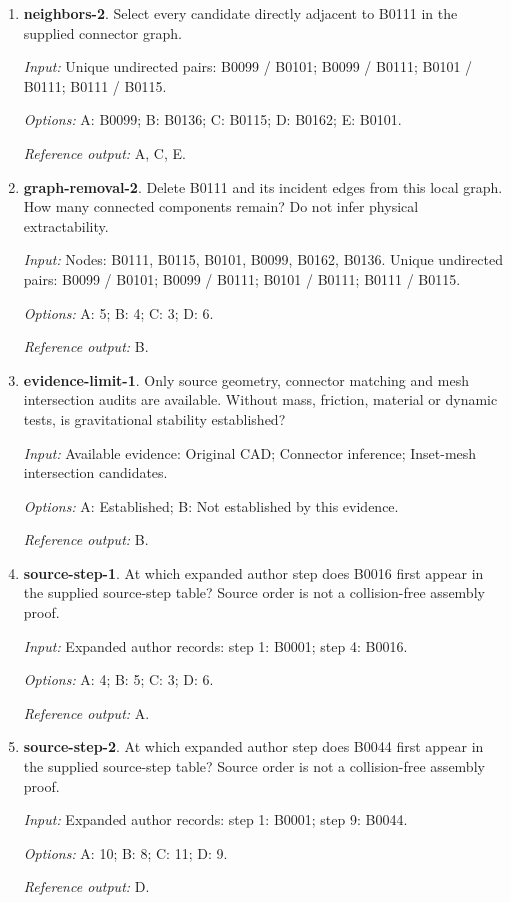 \begin{enumerate}
\item \textbf{neighbors-2}. Select every candidate directly adjacent to B0111 in the supplied connector graph.\par {\small \textit{Input:} Unique undirected pairs: B0099 / B0101; B0099 / B0111; B0101 / B0111; B0111 / B0115. \par\textit{Options:} A: B0099; B: B0136; C: B0115; D: B0162; E: B0101. \par\textit{Reference output:} A, C, E.}
\item \textbf{graph-removal-2}. Delete B0111 and its incident edges from this local graph. How many connected components remain? Do not infer physical extractability.\par {\small \textit{Input:} Nodes: B0111, B0115, B0101, B0099, B0162, B0136. Unique undirected pairs: B0099 / B0101; B0099 / B0111; B0101 / B0111; B0111 / B0115. \par\textit{Options:} A: 5; B: 4; C: 3; D: 6. \par\textit{Reference output:} B.}
\item \textbf{evidence-limit-1}. Only source geometry, connector matching and mesh intersection audits are available. Without mass, friction, material or dynamic tests, is gravitational stability established?\par {\small \textit{Input:} Available evidence: Original CAD; Connector inference; Inset-mesh intersection candidates. \par\textit{Options:} A: Established; B: Not established by this evidence. \par\textit{Reference output:} B.}
\item \textbf{source-step-1}. At which expanded author step does B0016 first appear in the supplied source-step table? Source order is not a collision-free assembly proof.\par {\small \textit{Input:} Expanded author records: step 1: B0001; step 4: B0016. \par\textit{Options:} A: 4; B: 5; C: 3; D: 6. \par\textit{Reference output:} A.}
\item \textbf{source-step-2}. At which expanded author step does B0044 first appear in the supplied source-step table? Source order is not a collision-free assembly proof.\par {\small \textit{Input:} Expanded author records: step 1: B0001; step 9: B0044. \par\textit{Options:} A: 10; B: 8; C: 11; D: 9. \par\textit{Reference output:} D.}

\end{enumerate}
